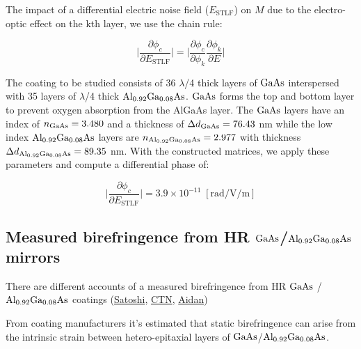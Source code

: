 \noindent The impact of a differential electric noise field ($E_\mathrm{STLF}$) on $M$ due to the electro-optic effect on the kth layer, we use the chain rule:

\begin{equation}
	\bigg| \frac{\partial \phi_c}{\partial  E_\mathrm{STLF}} \bigg| =  \bigg| \frac{\partial \phi_c}{\partial \phi_k}  \frac{\partial \phi_k}{\partial E} \bigg|
\end{equation}

The coating to be studied consists of 36 $\lambda$/4  thick layers of $\mathrm{GaAs}$ interspersed with 35 layers of $\lambda$/4 thick $\mathrm{Al_{0.92}Ga_{0.08}As}$. $\mathrm{GaAs}$ forms the top and bottom layer to prevent oxygen absorption from the AlGaAs layer. The $\mathrm{GaAs}$ layers have an index of $n_{\mathrm{GaAs}} = 3.480$ and a thickness of $\Delta d_{\mathrm{GaAs}} = 76.43$ nm while the low index $\mathrm{Al_{0.92}Ga_{0.08}As}$ layers are $n_{\mathrm{Al_{0.92}Ga_{0.08}As}} = 2.977$ with thickness $\Delta d_{\mathrm{Al_{0.92}Ga_{0.08}As}} = 89.35$ nm. With the constructed matrices, we apply these parameters and compute a differential phase of:

\begin{equation}
	\bigg| \frac{\partial \phi_c}{\partial  E_\mathrm{STLF}} \bigg|  = 3.9 \times 10^{-11}\; [\mathrm{rad}/\mathrm{V}/\mathrm{m}]      
\end{equation}


\subsection{Measured birefringence from HR \texorpdfstring{$\mathrm{GaAs}$}{gaas}/\texorpdfstring{$\mathrm{Al_{0.92}Ga_{0.08}As}$}{algaas} mirrors}

There are different accounts of a measured birefringence from HR $\mathrm{GaAs}$ / $\mathrm{Al_{0.92}Ga_{0.08}As}$ coatings (\href{https://dcc.ligo.org/DocDB/0181/G2200386/001/G2200386.pdf}{Satoshi}, \href{https://nodus.ligo.caltech.edu:8081/CTN/1474}{CTN}, \href{https://dcc.ligo.org/DocDB/0181/G2200559/001/G2200559-v1\%20-\%20polarization.pdf}{Aidan})

From coating manufacturers it's estimated that static birefringence can arise from the intrinsic strain between hetero-epitaxial layers of $\mathrm{GaAs}$/$\mathrm{Al_{0.92}Ga_{0.08}As}$. \cite{cole:2013, adachi:1985}


